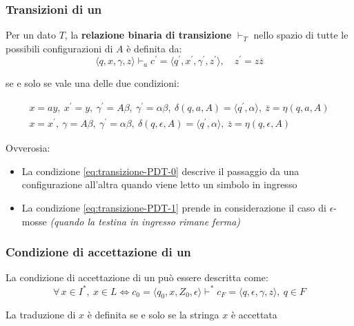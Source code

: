 \documentclass[italian, 10pt]{article}
\begin{document}
\subsubsection{Transizioni di un \PDT}

Per un dato \PDT \(T\), la \textbf{relazione binaria di transizione} \(\vdash_T\) nello spazio di tutte le possibili configurazioni di \(A\) è definita da:
\[ \langle q, x, \gamma, z \rangle \vdash_a c^\prime = \langle q^\prime, x^\prime, \gamma^\prime, z^\prime \rangle, \quad z^\prime = z \overline{z} \]

se e solo se vale una delle due condizioni:

\begin{gather}
  x = ay, \ x^\prime = y, \ \gamma^\prime = A \beta, \ \gamma^\prime = \alpha \beta, \ \delta(q, a, A) = \langle q^\prime, \alpha \rangle, \ \overline{z} = \eta(q, a, A) \label{eq:transizione-PDT-0} \\
  x = x^\prime, \ \gamma = A \beta, \ \gamma^\prime = \alpha\beta, \ \delta(q, \epsilon, A) = \langle q^\prime, \alpha \rangle, \ \overline{z} = \eta(q, \epsilon, A) \label{eq:transizione-PDT-1}
\end{gather}

Ovverosia:

\begin{itemize}
  \item La condizione \ref{eq:transizione-PDT-0} descrive il passaggio da una configurazione all'altra quando viene letto un simbolo in ingresso
  \item La condizione \ref{eq:transizione-PDT-1} prende in considerazione il caso di \(\epsilon\)-mosse \textit{(quando la testina in ingresso rimane ferma)}
\end{itemize}

\subsubsection{Condizione di accettazione di un \PDT}

La condizione di accettazione di un \PDT può essere descritta come:
\[ \forall \, x \in I^\ast, \ x \in L \Leftrightarrow c_0 = \langle q_0, x, Z_0, \epsilon \rangle \vdash^\ast c_F = \langle q, \epsilon, \gamma, z \rangle, \ q \in F\]

La traduzione di \(x\) è definita se e solo se la stringa \(x\) è accettata

\clearpage
\end{document}
